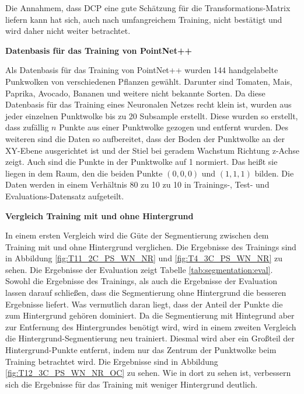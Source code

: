 \documentclass[12pt,titlepage, twoside]{article}
\begin{document}
Die Annahmem, dass DCP eine gute Schätzung für die Transformations-Matrix liefern kann hat sich, auch nach umfangreichem Training, nicht bestätigt und wird daher nicht weiter betrachtet.

\textbf{Datenbasis für das Training von PointNet++}

Als Datenbasis für das Training von PointNet++ wurden 144 handgelabelte Punkwolken von verschiedenen Pflanzen gewählt. Darunter sind Tomaten, Mais, Paprika, Avocado, Bananen und weitere nicht bekannte Sorten. 
Da diese Datenbasis für das Training eines Neuronalen Netzes recht klein ist, wurden aus jeder einzelnen Punktwolke bis zu 20 Subsample erstellt. 
Diese wurden so erstellt, dass zufällig $n$ Punkte aus einer Punktwolke gezogen und entfernt wurden.
Des weiteren sind die Daten so aufbereitet, dass der Boden der Punktwolke an der XY-Ebene ausgerichtet ist und der Stiel bei geradem Wachstum Richtung z-Achse zeigt. 
Auch sind die Punkte in der Punktwolke auf 1 normiert. 
Das heißt sie liegen in dem Raum, den die beiden Punkte $(0,0,0)$ und $(1,1,1)$ bilden. Die Daten werden in einem Verhältnis 80 zu 10 zu 10 in Trainings-, Test- und Evaluations-Datensatz aufgeteilt.

\textbf{Vergleich Training mit und ohne Hintergrund}

In einem ersten Vergleich wird die Güte der Segmentierung zwischen dem Training mit und ohne Hintergrund verglichen. 
Die Ergebnisse des Trainings sind in Abbildung \ref{fig:T11_2C_PS_WN_NR} und \ref{fig:T4_3C_PS_WN_NR} zu sehen.
Die Ergebnisse der Evaluation zeigt Tabelle \ref{tab:segmentation:eval}. 
Sowohl die Ergebnisse des Trainings, als auch die Ergebnisse der Evaluation lassen darauf schließen, dass die Segmentierung ohne Hintergrund die besseren Ergebnisse liefert.
Was vermutlich daran liegt, dass der Anteil der Punkte die zum Hintergrund gehören dominiert.
Da die Segmentierung mit Hintegrund aber zur Entfernung des Hintergrundes benötigt wird, wird in einem zweiten Vergleich die Hintergrund-Segmentierung neu trainiert. 
Diesmal wird aber ein Großteil der Hintergrund-Punkte entfernt, indem nur das Zentrum der Punktwolke beim Training betrachtet wird. Die Ergebnisse sind in Abbildung \ref{fig:T12_3C_PS_WN_NR_OC} zu sehen.
Wie in dort zu sehen ist, verbessern sich die Ergebnisse für das Training mit weniger Hintergrund deutlich. 
\end{document}
